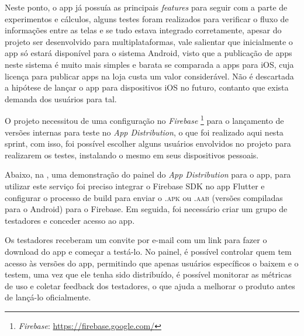  Neste ponto, o \ac{app} já possuía as principais \textit{features} para seguir com a parte de experimentos e cálculos, alguns testes foram realizados para verificar o fluxo de informações entre as telas e se tudo estava integrado corretamente, apesar do projeto ser desenvolvido para multiplataformas, vale salientar que inicialmente o \ac{app} só estará disponível para o sistema Android, visto que a publicação de \acp{app} neste sistema é muito mais simples e barata se comparada a \acp{app} para iOS, cuja licença para publicar \acp{app} na loja custa um valor considerável. Não é descartada a hipótese de lançar o \ac{app} para dispositivos iOS no futuro, contanto que exista demanda dos usuários para tal.

 O projeto necessitou de uma configuração no \textit{Firebase} \footnote{\label{firebase}\textit{Firebase}: \url{https://firebase.google.com/}} para o lançamento de versões internas para teste no \textit{App Distribution}, o que foi realizado aqui nesta sprint, com isso, foi possível escolher alguns usuários envolvidos no projeto para realizarem os testes, instalando o mesmo em seus dispositivos pessoais. 

 Abaixo, na , uma demonstração do painel do \textit{App Distribution} para o \ac{app}, para utilizar este serviço foi preciso integrar o Firebase SDK no \ac{app} Flutter e configurar o processo de build para enviar o \textsc{.apk} ou \textsc{.aab} (versões compiladas para o Android) para o Firebase. Em seguida, foi necessário criar um grupo de testadores e conceder acesso ao \ac{app}.

Os testadores receberam um convite por e-mail com um link para fazer o download do \ac{app} e começar a testá-lo. No painel, é possível controlar quem tem acesso às versões do \ac{app}, permitindo que apenas usuários específicos o baixem e o testem, uma vez que ele tenha sido distribuído, é possível monitorar as métricas de uso e coletar feedback dos testadores, o que ajuda a melhorar o produto antes de lançá-lo oficialmente.


